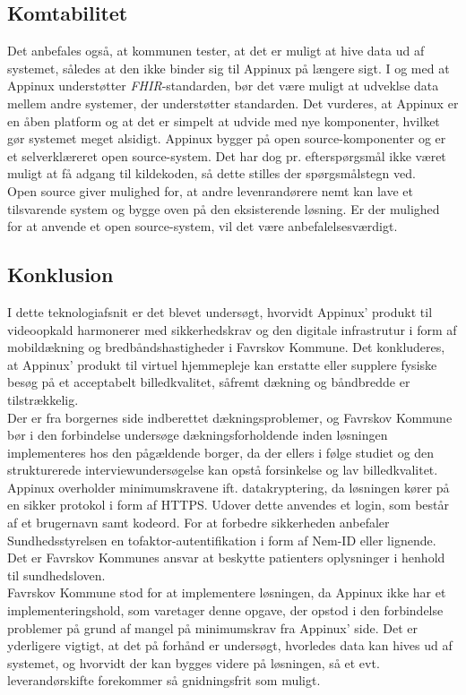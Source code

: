 \subsection{Komtabilitet}
Det anbefales også, at kommunen tester, at det er muligt at hive data ud af systemet, således at den ikke binder sig til Appinux på længere sigt. I og med at Appinux understøtter \textit{FHIR}-standarden, bør det være muligt at udveklse data mellem andre systemer, der understøtter standarden. Det vurderes, at Appinux er en åben platform og at det er simpelt at udvide med nye komponenter, hvilket gør systemet meget alsidigt. Appinux bygger på open source-komponenter og er et selverklæreret open source-system. Det har dog pr. efterspørgsmål ikke været muligt at få adgang til kildekoden, så dette stilles der spørgsmålstegn ved.\\Open source giver mulighed for, at andre levenrandørere nemt kan lave et tilsvarende system og bygge oven på den eksisterende løsning. Er der mulighed for at anvende et open source-system, vil det være anbefalelsesværdigt.
\subsection{Konklusion}
I dette teknologiafsnit er det blevet undersøgt, hvorvidt Appinux’ produkt til videoopkald harmonerer med sikkerhedskrav og den digitale infrastrutur i form af mobildækning og bredbåndshastigheder i Favrskov Kommune.
Det konkluderes, at Appinux’ produkt til virtuel hjemmepleje kan erstatte eller supplere fysiske besøg på et acceptabelt billedkvalitet, såfremt dækning og båndbredde er tilstrækkelig.
\\Der er fra borgernes side indberettet dækningsproblemer, og Favrskov Kommune bør i den forbindelse undersøge dækningsforholdende inden løsningen implementeres hos den pågældende borger, da der ellers i følge studiet og den strukturerede interviewundersøgelse kan opstå forsinkelse og lav billedkvalitet.\\
Appinux overholder minimumskravene ift. datakryptering, da løsningen kører på en sikker protokol i form af HTTPS. Udover dette anvendes et login, som består af et brugernavn samt kodeord. For at forbedre sikkerheden anbefaler Sundhedsstyrelsen en tofaktor-autentifikation i form af Nem-ID eller lignende. Det er Favrskov Kommunes ansvar at beskytte patienters oplysninger i henhold til sundhedsloven.\\ 
Favrskov Kommune stod for at implementere løsningen, da Appinux ikke har et implementeringshold, som varetager denne opgave, der opstod i den forbindelse problemer på grund af mangel på minimumskrav fra Appinux' side. Det er yderligere vigtigt, at det på forhånd er undersøgt, hvorledes data kan hives ud af systemet, og hvorvidt der kan bygges videre på løsningen, så et evt. leverandørskifte forekommer så gnidningsfrit som muligt.
